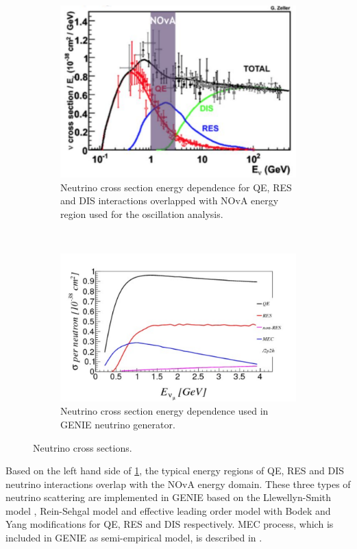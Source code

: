 \begin{figure}[t!]
\begin{subfigure}[t]{.5\textwidth}
  \centering
  \includegraphics[width=0.85\linewidth]{figures/nu_channels.pdf}
  \caption{Neutrino cross section energy dependence for QE, RES and DIS interactions overlapped with 
	NOvA energy region used for the oscillation analysis.}
  \label{fig:NovaEReg}
\end{subfigure}%
~
\begin{subfigure}[t]{.5\textwidth}
  \centering
  \includegraphics[width=1.1\linewidth]{figures/mec_xsec.pdf}
  \caption{Neutrino cross section energy dependence used in GENIE neutrino generator.}
  \label{fig:mecXsec}
\end{subfigure}
\caption{Neutrino cross sections.}
\label{fig:simPlots}
\end{figure}

Based on the left hand side of \ref{fig:NovaEReg}, the typical energy regions of QE, RES and DIS neutrino 
interactions overlap with the NOvA energy domain. These three types of neutrino scattering are implemented 
in GENIE based on the Llewellyn-Smith model \cite{QE}, Rein-Sehgal model \cite{RES} and effective leading 
order model with Bodek and Yang modifications \cite{DIS} for QE, RES and DIS respectively. MEC process, 
which is included in GENIE as semi-empirical model, is described in \cite{MEC}.

